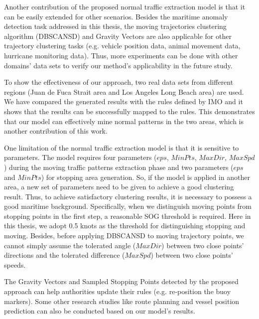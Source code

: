 \documentclass[12pt,glossary]{dalcsthesis}
\begin{document}
Another contribution of the proposed normal traffic extraction model is that it can be easily extended for other scenarios. Besides the maritime anomaly detection task addressed in this thesis, the moving trajectories clustering algorithm (DBSCANSD) and Gravity Vectors are also applicable for other trajectory clustering tasks (e.g. vehicle position data, animal movement data, hurricane monitoring data). Thus, more experiments can be done with other domains' data sets to verify our method's applicability in the future study.

To show the effectiveness of our approach, two real data sets from different regions (Juan de Fuca Strait area and Los Angeles Long Beach area) are used. We have compared the generated results with the rules defined by IMO and it shows that the results can be successfully mapped to the rules. This demonstrates that our model can effectively mine normal patterns in the two areas, which is another contribution of this work.

One limitation of the normal traffic extraction model is that it is sensitive to parameters. The model requires four parameters ($eps$, $MinPts$, $MaxDir$, $MaxSpd$) during the moving traffic patterns extraction phase and two parameters ($eps$ and $MinPts$) for stopping area generation. So, if the model is applied in another area, a new set of parameters need to be given to achieve a good clustering result. Thus, to achieve satisfactory clustering results, it is necessary to possess a good maritime background. Specifically, when we distinguish moving points from stopping points in the first step, a reasonable SOG threshold is required. Here in this thesis, we adopt 0.5 knots as the threshold for distinguishing stopping and moving. Besides, before applying DBSCANSD to moving trajectory points, we cannot simply assume the tolerated angle ($MaxDir$) between two close points' directions and the tolerated difference ($MaxSpd$) between two close points' speeds.







The Gravity Vectors and Sampled Stopping Points detected by the proposed approach can help authorities update their rules (e.g. re-position the buoy markers).  Some other research studies like route planning and vessel position prediction can also be conducted based on our model's results. 
\end{document}
